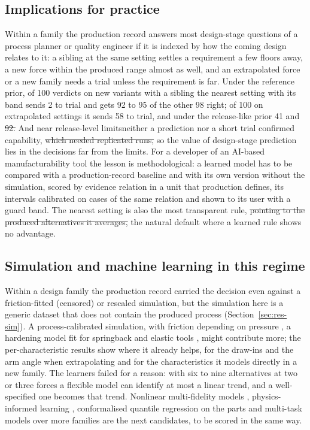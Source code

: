 \documentclass[pdflatex,sn-basic,lineno]{sn-jnl}
\providecommand{\DIFadd}[1]{{\protect\color{blue}\uwave{#1}}} %
\providecommand{\DIFdel}[1]{{\protect\color{red}\sout{#1}}}                      %
\providecommand{\DIFaddbegin}{} %
\providecommand{\DIFaddend}{} %
\providecommand{\DIFdelbegin}{} %
\providecommand{\DIFdelend}{} %
\newcommand{\DIFscaledelfig}{0.5}
\newlength{\DIFdelgraphicswidth} %
\newlength{\DIFdelgraphicsheight} %
\newcommand{\DIFaddincludegraphics}[2][]{{\color{blue}\fbox{\DIFOincludegraphics[#1]{#2}}}} %
\newcommand{\DIFdelincludegraphics}[2][]{%
\sbox{\DIFdelgraphicsbox}{\DIFOincludegraphics[#1]{#2}}%
\settoboxwidth{\DIFdelgraphicswidth}{\DIFdelgraphicsbox} %
\settoboxtotalheight{\DIFdelgraphicsheight}{\DIFdelgraphicsbox} %
\scalebox{\DIFscaledelfig}{%
\parbox[b]{\DIFdelgraphicswidth}{\usebox{\DIFdelgraphicsbox}\\[-\baselineskip] \rule{\DIFdelgraphicswidth}{0em}}\llap{\resizebox{\DIFdelgraphicswidth}{\DIFdelgraphicsheight}{%
\setlength{\unitlength}{\DIFdelgraphicswidth}%
\begin{picture}(1,1)%
\thicklines\linethickness{2pt} %
{\color[rgb]{1,0,0}\put(0,0){\framebox(1,1){}}}%
{\color[rgb]{1,0,0}\put(0,0){\line( 1,1){1}}}%
{\color[rgb]{1,0,0}\put(0,1){\line(1,-1){1}}}%
\end{picture}%
}\hspace*{3pt}}} %
} %
\DeclareRobustCommand{\DIFaddbegin}{\DIFOaddbegin \let\includegraphics\DIFaddincludegraphics} %
\DeclareRobustCommand{\DIFaddend}{\DIFOaddend \let\includegraphics\DIFOincludegraphics} %
\DeclareRobustCommand{\DIFdelbegin}{\DIFOdelbegin \let\includegraphics\DIFdelincludegraphics} %
\DeclareRobustCommand{\DIFdelend}{\DIFOaddend \let\includegraphics\DIFOincludegraphics} %
\begin{document}
\subsection{Implications for practice}

Within a family the production record answers most design-stage questions of a process planner or quality engineer if it is indexed by how the coming design relates to it: a sibling at the same setting settles a requirement a few floors away, a new force within the produced range almost as well, and an extrapolated force or a new family needs a trial unless the requirement is far. Under the reference prior, of 100 verdicts on new variants with a sibling the nearest setting with its band sends 2 to trial and gets 92 to 95 of the other 98 right; of 100 on extrapolated settings it sends 58 to trial, and under the release-like prior 41 and \DIFdelbegin \DIFdel{92. }\DIFdelend \DIFaddbegin \DIFadd{92, getting 6 of the other 8 right. }\DIFaddend And near release-level limits\DIFaddbegin \DIFadd{, once runs differed by a floor, }\DIFaddend neither a prediction nor a short trial confirmed capability, \DIFdelbegin \DIFdel{which needed replicated runs, }\DIFdelend so the value of design-stage prediction lies in the decisions far from the limits. For a developer of an AI-based manufacturability tool the lesson is methodological: a learned model has to be compared with a production-record baseline and with its own version without the simulation, scored by evidence relation in a unit that production defines, its intervals calibrated on cases of the same relation and shown to its user with a guard band. The nearest setting is also the most transparent rule, \DIFdelbegin \DIFdel{pointing to the produced alternatives it averages, }\DIFdelend the natural default where a learned rule shows no advantage.

\subsection{Simulation and machine learning in this regime}

Within a design family the production record carried the decision even against a friction-fitted (censored) or rescaled simulation, but the simulation here is a generic dataset that does not contain the produced process (Section~\ref{sec:res-sim}). A process-calibrated simulation, with friction depending on pressure \citep{hol2012advanced}, a hardening model fit for springback \citep{wagoner2013advanced} and elastic tools \citep{pilthammar2018introduction}, might contribute more; the per-characteristic results show where it already helps, for the draw-ins and the arm angle when extrapolating and for the characteristics it models directly in a new family. The learners failed for a reason: with six to nine alternatives at two or three forces a flexible model can identify at most a linear trend, and a well-specified one becomes that trend. Nonlinear multi-fidelity models \citep{perdikaris2017nonlinear}, physics-informed learning \citep{karniadakis2021physics}, conformalised quantile regression on the parts \citep{romano2019conformalized} and multi-task models over more families \citep{bonilla2008multi} are the next candidates, to be scored in the same way.
\end{document}

